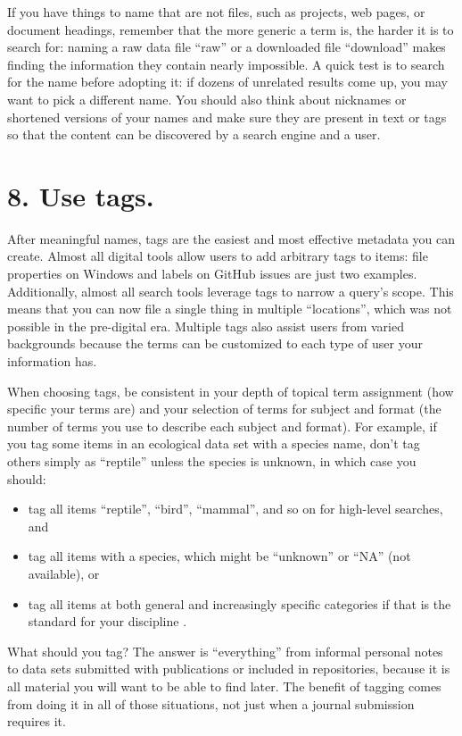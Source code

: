 \documentclass[10pt,letterpaper]{article}
\newcommand{\rulemajor}[1]{\section*{#1}}
\begin{document}
If you have things to name that are not files, such as projects, web pages, or
document headings, remember that the more generic a term is, the harder it is to
search for: naming a raw data file ``raw'' or a downloaded file ``download''
makes finding the information they contain nearly impossible. A quick test is to
search for the name before adopting it: if dozens of unrelated results come up,
you may want to pick a different name. You should also think about nicknames or
shortened versions of your names and make sure they are present in text or tags
so that the content can be discovered by a search engine and a user.

\rulemajor{8. Use tags.}

After meaningful names, tags are the easiest and most effective metadata you can
create.  Almost all digital tools allow users to add arbitrary tags to items:
file properties on Windows and labels on GitHub issues are just two examples.
Additionally, almost all search tools leverage tags to narrow a query's
scope. This means that you can now file a single thing in multiple
``locations'', which was not possible in the pre-digital era. Multiple tags also
assist users from varied backgrounds because the terms can be customized to each
type of user your information has.

When choosing tags, be consistent in your depth of topical term assignment (how
specific your terms are) and your selection of terms for subject and format (the
number of terms you use to describe each subject and format). For example, if
you tag some items in an ecological data set with a species name, don't tag
others simply as ``reptile'' unless the species is unknown, in which case you
should:

\begin{itemize}

\item
  tag all items ``reptile'', ``bird'', ``mammal'', and so on for high-level
  searches, and

\item
  tag all items with a species, which might be ``unknown'' or ``NA'' (not
  available), or
  
\item
  tag all items at both general and increasingly specific categories if that is the standard for your discipline \cite{FAIR2020}.

\end{itemize}

What should you tag?  The answer is ``everything'' from informal personal notes
to data sets submitted with publications or included in repositories, because it
is all material you will want to be able to find later.  The benefit of tagging
comes from doing it in all of those situations, not just when a journal
submission requires it.
\end{document}
